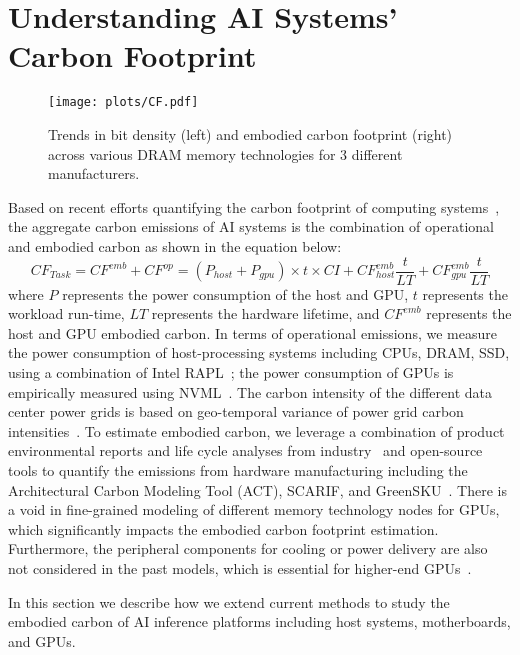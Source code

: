 \section{Understanding AI Systems' Carbon Footprint}

\begin{figure}[t]
    \centering
\texttt{[image: plots/CF.pdf]}
\vspace{-1.5em}
    \caption{Trends in bit density (left) and embodied carbon footprint (right) across various DRAM memory technologies for 3 different manufacturers.}
    \label{fig:bitdensity_carbon}
    \vspace{-1em}
\end{figure}


Based on recent efforts quantifying the carbon footprint of computing systems~\cite{ACT, SCARIF, eeckhout2024focal}, the aggregate carbon emissions of AI systems is the combination of operational and embodied carbon as shown in the equation below:
{\footnotesize 
$$
    CF_{Task}  =  CF^{emb} + CF^{op} 
= (P_{host} + P_{gpu})\times t \times CI + CF^{emb}_{host} \frac{t}{LT} + CF^{emb}_{gpu} \frac{t}{LT}
 $$
}
where $P$ represents the power consumption of the host and GPU, $t$ represents the workload run-time, $LT$ represents the hardware lifetime, and $CF^{emb}$ represents the host and GPU embodied carbon.
In terms of operational emissions, we measure the power consumption of host-processing systems including CPUs, DRAM, SSD, using a combination of Intel RAPL~\cite{RAPL}; the power consumption of GPUs is empirically measured using NVML~\cite{nvml}.
The carbon intensity of the different data center power grids is based on geo-temporal variance of power grid carbon intensities~\cite{acun2023carbon, greensku, watttime,electricitymaps}.
To estimate embodied carbon, we leverage a combination of product environmental reports and life cycle analyses from industry~\cite{dellr740} and open-source tools to quantify the emissions from hardware manufacturing including the Architectural Carbon Modeling Tool (ACT), SCARIF, and GreenSKU~\cite{ACT, SCARIF, greensku}. There is a void in fine-grained modeling of different memory technology nodes for GPUs, which significantly impacts the embodied carbon footprint estimation. Furthermore, the peripheral components for cooling or power delivery are also not considered in the past models, which is essential for higher-end GPUs~\cite{ACT, SCARIF}.


In this section we describe how we extend current methods to study the embodied carbon of AI inference platforms including host systems, motherboards, and GPUs.





